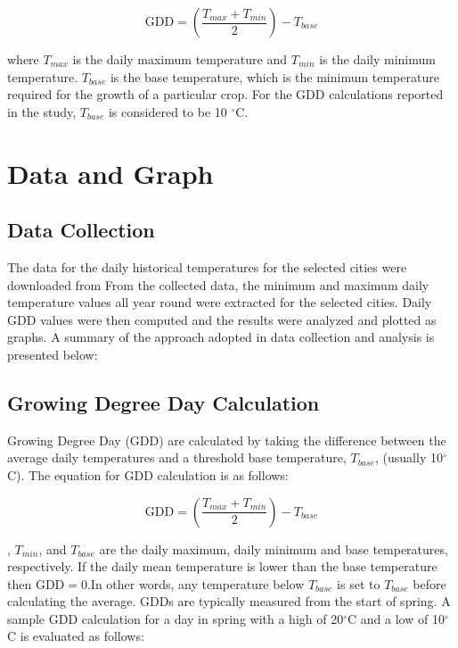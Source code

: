 \documentclass{article}
\begin{document}
\begin{equation}
\textrm{GDD} = \left(\frac{T_{max} + T_{min}}{2}\right) - T_{base}
\label{eqn:gdd}
\end{equation}

\noindent where {$T_{max}$} is the daily maximum temperature and {$T_{min}$} is the daily minimum temperature. {$T_{base}$} is the base temperature, which is the minimum temperature required for the growth of a particular crop. For the GDD calculations reported in the study, {$T_{base}$} is considered to be 10 $^{\circ}$C.\\


\section{ \bf Data and Graph}
\subsection{Data Collection}
The data for the daily historical temperatures for the selected cities were downloaded from From the collected data, the minimum and maximum daily temperature values all year round were extracted for the selected cities. Daily GDD values were then computed and the results were analyzed and plotted as graphs. A summary of the approach adopted in data collection and analysis is presented below:



\subsection{Growing Degree Day Calculation}
Growing Degree Day (GDD) are calculated by taking the difference between the average daily temperatures and a threshold base temperature, $T_{base}$, (usually 10$^{\circ}$C). The equation for GDD calculation is as follows: \vspace{5mm}

\begin{equation}
\textrm{GDD} = \left(\frac{T_{max} + T_{min}}{2}\right) - T_{base}
\end{equation}

, {$T_{min}$}, and {$T_{base}$} are the daily maximum, daily minimum and base temperatures, respectively. If the daily mean temperature is lower than the base temperature then $\textrm{GDD} = 0$.In other words, any temperature below $T_{base}$ is set to $T_{base}$ before calculating the average. GDDs are typically measured from the start of spring. A sample GDD calculation for a day in spring with a high of 20$^{\circ}$C and a low of 10$^{\circ}$C is evaluated as follows:\vspace{5mm}
\end{document}
